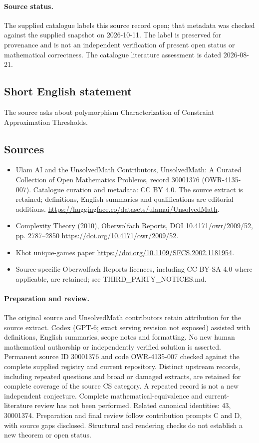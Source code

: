 \documentclass[11pt]{article}
\begin{document}
\paragraph{Source status.}
The supplied catalogue labels this source record open; that metadata was checked against the supplied snapshot on 2026-10-11. The label is preserved for provenance and is not an independent verification of present open status or mathematical correctness. The catalogue literature assessment is dated 2026-08-21.
\subsection{Short English statement}
The source asks about polymorphism Characterization of Constraint Approximation Thresholds.
\subsection{Sources}
\begin{itemize}
\item[\hypertarget{source:30001376:1}{S1}] Ulam AI and the UnsolvedMath Contributors, UnsolvedMath: A Curated Collection of Open Mathematics Problems, record 30001376 (OWR-4135-007). Catalogue curation and metadata: CC BY 4.0. The source extract is retained; definitions, English summaries and qualifications are editorial additions.
\url{https://huggingface.co/datasets/ulamai/UnsolvedMath}.
\item[\hypertarget{source:30001376:2}{S2}] Complexity Theory (2010), Oberwolfach Reports, DOI 10.4171/owr/2009/52, pp. 2787--2850
\url{https://doi.org/10.4171/owr/2009/52}.
\item[\hypertarget{source:30001376:3}{S3}] Khot unique-games paper
\url{https://doi.org/10.1109/SFCS.2002.1181954}.
\item Source-specific Oberwolfach Reports licences, including CC BY-SA 4.0 where applicable, are retained; see THIRD\_PARTY\_NOTICES.md.
\end{itemize}
\paragraph{Preparation and review.}
The original source and UnsolvedMath contributors retain attribution for the source extract. Codex (GPT-6; exact serving revision not exposed) assisted with definitions, English summaries, scope notes and formatting. No new human mathematical authorship or independently verified solution is asserted. Permanent source ID 30001376 and code OWR-4135-007 checked against the complete supplied registry and current repository. Distinct upstream records, including repeated questions and broad or damaged extracts, are retained for complete coverage of the source CS category. A repeated record is not a new independent conjecture. Complete mathematical-equivalence and current-literature review has not been performed. Related canonical identities: 43, 30001374. Preparation and final review follow contribution prompts C and D, with source gaps disclosed. Structural and rendering checks do not establish a new theorem or open status.
\label{end:30001376}
\end{document}
